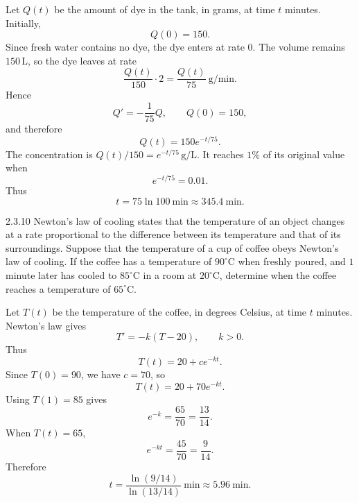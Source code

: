 \documentclass[11pt,oneside]{article}
\begin{document}
\begin{solution}
Let $Q(t)$ be the amount of dye in the tank, in grams, at time $t$ minutes. Initially,
\[
    Q(0)=150.
\]
Since fresh water contains no dye, the dye enters at rate $0$. The volume remains $150\,\mathrm{L}$, so the dye leaves at rate
\[
    \frac{Q(t)}{150}\cdot2=\frac{Q(t)}{75}\ \mathrm{g/min}.
\]
Hence
\[
    Q'=-\frac{1}{75}Q,
    \qquad
    Q(0)=150,
\]
and therefore
\[
    Q(t)=150e^{-t/75}.
\]
The concentration is $Q(t)/150=e^{-t/75}\,\mathrm{g/L}$. It reaches $1\%$ of its original value when
\[
    e^{-t/75}=0.01.
\]
Thus
\[
    \boxed{t=75\ln100\ \mathrm{min}\approx345.4\ \mathrm{min}}.
\]
\end{solution}

\begin{problem}{2.3.10}
Newton's law of cooling states that the temperature of an object changes at a rate proportional to the difference between its temperature and that of its surroundings. Suppose that the temperature of a cup of coffee obeys Newton's law of cooling. If the coffee has a temperature of $90^{\circ}\mathrm{C}$ when freshly poured, and $1$ minute later has cooled to $85^{\circ}\mathrm{C}$ in a room at $20^{\circ}\mathrm{C}$, determine when the coffee reaches a temperature of $65^{\circ}\mathrm{C}$.
\end{problem}

\begin{solution}
Let $T(t)$ be the temperature of the coffee, in degrees Celsius, at time $t$ minutes. Newton's law gives
\[
    T'=-k(T-20),
    \qquad
    k>0.
\]
Thus
\[
    T(t)=20+ce^{-kt}.
\]
Since $T(0)=90$, we have $c=70$, so
\[
    T(t)=20+70e^{-kt}.
\]
Using $T(1)=85$ gives
\[
    e^{-k}=\frac{65}{70}=\frac{13}{14}.
\]
When $T(t)=65$,
\[
    e^{-kt}=\frac{45}{70}=\frac{9}{14}.
\]
Therefore
\[
    \boxed{
        t=\frac{\ln(9/14)}{\ln(13/14)}\ \mathrm{min}
        \approx5.96\ \mathrm{min}
    }.
\]
\end{solution}
\end{document}

